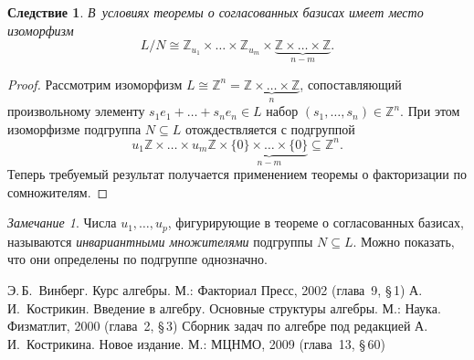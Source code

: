 \documentclass[a4paper,10pt]{amsart}
\def\ZZ{{\mathbb Z}}%
\newtheorem{corollary}{Следствие}
\theoremstyle{definition}
\theoremstyle{remark}
\newtheorem{remark}{Замечание}
\begin{document}
\begin{corollary}
В~условиях теоремы о согласованных базисах имеет место изоморфизм
$$
L / N \cong \ZZ_{u_1} \times \ldots \times \ZZ_{u_m} \times
\underbrace{\ZZ \times \ldots \times \ZZ}_{n - m}.
$$
\end{corollary}

\begin{proof}
Рассмотрим изоморфизм $L \cong \ZZ^n = \underbrace{\ZZ \times \ldots
\times \ZZ}_n$, сопоставляющий произвольному элементу $s_1 e_1 +
\ldots + s_n e_n \in L$ набор $(s_1, \ldots, s_n) \in \ZZ^n$. При
этом изоморфизме подгруппа $N \subseteq L$ отождествляется с
подгруппой
$$
u_1 \ZZ \times \ldots \times u_m \ZZ \times \underbrace{\lbrace 0
\rbrace \times \ldots \times \lbrace 0 \rbrace}_{n-m} \subseteq
\ZZ^n.
$$
Теперь требуемый результат получается применением теоремы о
факторизации по сомножителям.
\end{proof}

\begin{remark}
Числа $u_1, \ldots, u_p$, фигурирующие в теореме о согласованных
базисах, называются {\it инвариантными множителями} подгруппы $N
\subseteq L$. Можно показать, что они определены по подгруппе
однозначно.
\end{remark}



\bigskip

\begin{thebibliography}{99}
Э.\,Б.~Винберг. Курс алгебры. М.: Факториал Пресс, 2002 (глава~9,
\S\,1)
А.\,И.~Кострикин. Введение в алгебру. Основные структуры алгебры.
М.: Наука. Физматлит, 2000 (глава~2, \S\,3)
Сборник задач по алгебре под редакцией А.\,И.~Кострикина. Новое
издание. М.: МЦНМО, 2009 (глава~13, \S\,60)
\end{thebibliography}
\end{document}
